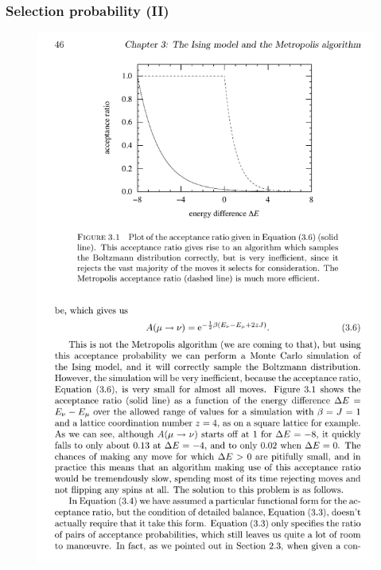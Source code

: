 \documentclass[hyperref={colorlinks=true}]{beamer}
\begin{document}
\begin{frame}%
  \frametitle{Selection probability (II)}
  
  \begin{figure}
    \centering
    \includegraphics[width=\columnwidth]{MetropolisAlgorithmAcceptanceRatio.pdf}
  \end{figure}
  
\end{frame}

\end{document}

